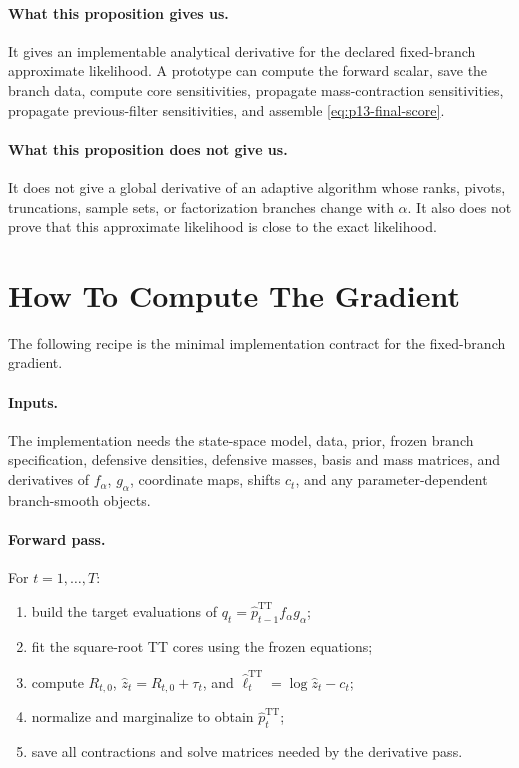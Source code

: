 \documentclass[11pt]{article}
\newcommand{\TT}{\mathrm{TT}}
\theoremstyle{definition}
\theoremstyle{remark}
\begin{document}
\paragraph{What this proposition gives us.}
It gives an implementable analytical derivative for the declared fixed-branch
approximate likelihood.  A prototype can compute the forward scalar, save the
branch data, compute core sensitivities, propagate mass-contraction
sensitivities, propagate previous-filter sensitivities, and assemble
\eqref{eq:p13-final-score}.

\paragraph{What this proposition does not give us.}
It does not give a global derivative of an adaptive algorithm whose ranks,
pivots, truncations, sample sets, or factorization branches change with
\(\alpha\).  It also does not prove that this approximate likelihood is close
to the exact likelihood.

\section{How To Compute The Gradient}

The following recipe is the minimal implementation contract for the
fixed-branch gradient.

\paragraph{Inputs.}
The implementation needs the state-space model, data, prior, frozen branch
specification, defensive densities, defensive masses, basis and mass matrices,
and derivatives of \(f_\alpha\), \(g_\alpha\), coordinate maps, shifts
\(c_t\), and any parameter-dependent branch-smooth objects.

\paragraph{Forward pass.}
For \(t=1,\ldots,T\):
\begin{enumerate}[leftmargin=*]
\item build the target evaluations of
  \(q_t=\widehat p_{t-1}^{\TT}f_\alpha g_\alpha\);
\item fit the square-root TT cores using the frozen equations;
\item compute \(R_{t,0}\), \(\widehat z_t=R_{t,0}+\tau_t\), and
  \(\widehat\ell_t^{\TT}=\log\widehat z_t-c_t\);
\item normalize and marginalize to obtain \(\widehat p_t^{\TT}\);
\item save all contractions and solve matrices needed by the derivative pass.
\end{enumerate}
\end{document}
